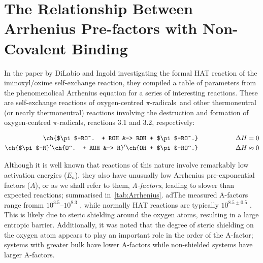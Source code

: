 
\chapter{The Relationship Between Arrhenius Pre-factors with Non-Covalent Binding}
\label{ch:arrhenius}

In the paper by DiLabio and Ingold\cite{DiLabio2005} investigating the formal HAT reaction of the iminoxyl/oxime self-exchange reaction, they compiled a table of parameters from the phenomenolical Arrhenius equation for a series of interesting reactions.\cite{Kreilick1966, Mader2004, Mahoney1970, DaRooge1967, Howard1973, Foti1994, Chenier1974, Chenier1975} These are self-exchange reactions of oxygen-centred $\pi$-radicals\footnotemark~and other thermoneutral (or nearly thermoneutral) reactions involving the destruction and formation of oxygen-centred $\pi$-radicals, reactions 3.1 and 3.2, respectively:


\begin{align}
  \ch{$\pi$-RO^. + ROH &-> ROH + $\pi$-RO^.} \hspace{2cm} \Delta H = 0 \\
  \ch{$\pi$-R}^\prime\ch{O^. + ROH &-> R}^\prime\ch{OH + $\pi$-RO^.} \hspace{2cm} \Delta H \approx 0
\end{align}

Although it is well known that reactions of this nature involve remarkably low activation energies ($E_a$),\cite{Lucarini1996,Mahoney1970a,Mahoney1975,Korcek1972} they also have unusually low Arrhenius pre-exponential factors ($A$), or as we shall refer to them, \emph{A-factors}, leading to slower than expected reactions; summarised in~\ref{tab:Arrhenius}.
adThe measured A-factors range fromm $10^{3.5}$--$10^{8.3}$ \Ms, while normally HAT reactions are typically $10^{8.5\pm0.5}$ \Ms.\cite{Benson1976} This is likely due to steric shielding around the oxygen atoms, resulting in a large entropic barrier.\cite{DiLabio2005} Additionally, it was noted that the degree of steric shielding on the oxygen atom appears to play an important role in the order of the A-factor; systems with greater bulk have lower A-factors while non-shielded systems have larger A-factors.

